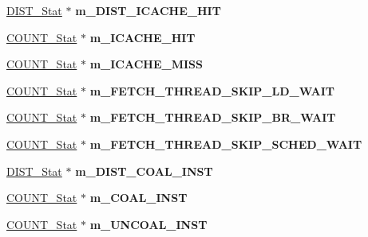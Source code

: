 \begin{DoxyCompactItemize}
\item 
\hypertarget{classall__stats__c_a4f71d03085a36c3afc4b6649ba4a90ba}{
\hyperlink{classDIST__Stat}{DIST\_\-Stat} $\ast$ {\bfseries m\_\-DIST\_\-ICACHE\_\-HIT}}
\label{classall__stats__c_a4f71d03085a36c3afc4b6649ba4a90ba}

\item 
\hypertarget{classall__stats__c_a26ccf1270415f147dc3779dcb2948dde}{
\hyperlink{classCOUNT__Stat}{COUNT\_\-Stat} $\ast$ {\bfseries m\_\-ICACHE\_\-HIT}}
\label{classall__stats__c_a26ccf1270415f147dc3779dcb2948dde}

\item 
\hypertarget{classall__stats__c_adc272519cccd097dd9ae4736b7360a69}{
\hyperlink{classCOUNT__Stat}{COUNT\_\-Stat} $\ast$ {\bfseries m\_\-ICACHE\_\-MISS}}
\label{classall__stats__c_adc272519cccd097dd9ae4736b7360a69}

\item 
\hypertarget{classall__stats__c_a4742df6c14cb9cffaab75d9e6dfecd7e}{
\hyperlink{classCOUNT__Stat}{COUNT\_\-Stat} $\ast$ {\bfseries m\_\-FETCH\_\-THREAD\_\-SKIP\_\-LD\_\-WAIT}}
\label{classall__stats__c_a4742df6c14cb9cffaab75d9e6dfecd7e}

\item 
\hypertarget{classall__stats__c_ab722d06646072945c2f9b8f84aa8ba72}{
\hyperlink{classCOUNT__Stat}{COUNT\_\-Stat} $\ast$ {\bfseries m\_\-FETCH\_\-THREAD\_\-SKIP\_\-BR\_\-WAIT}}
\label{classall__stats__c_ab722d06646072945c2f9b8f84aa8ba72}

\item 
\hypertarget{classall__stats__c_a8eae59fbc8624d43f53ec9aa2dc7a54d}{
\hyperlink{classCOUNT__Stat}{COUNT\_\-Stat} $\ast$ {\bfseries m\_\-FETCH\_\-THREAD\_\-SKIP\_\-SCHED\_\-WAIT}}
\label{classall__stats__c_a8eae59fbc8624d43f53ec9aa2dc7a54d}

\item 
\hypertarget{classall__stats__c_a6b127b5b4c9363f615a64e239648b085}{
\hyperlink{classDIST__Stat}{DIST\_\-Stat} $\ast$ {\bfseries m\_\-DIST\_\-COAL\_\-INST}}
\label{classall__stats__c_a6b127b5b4c9363f615a64e239648b085}

\item 
\hypertarget{classall__stats__c_a091f1effe8bf97efc9bcae50dfefb358}{
\hyperlink{classCOUNT__Stat}{COUNT\_\-Stat} $\ast$ {\bfseries m\_\-COAL\_\-INST}}
\label{classall__stats__c_a091f1effe8bf97efc9bcae50dfefb358}

\item 
\hypertarget{classall__stats__c_a27425b33b2619b3a50c6d7bd93d1de13}{
\hyperlink{classCOUNT__Stat}{COUNT\_\-Stat} $\ast$ {\bfseries m\_\-UNCOAL\_\-INST}}
\label{classall__stats__c_a27425b33b2619b3a50c6d7bd93d1de13}


\end{DoxyCompactItemize}
